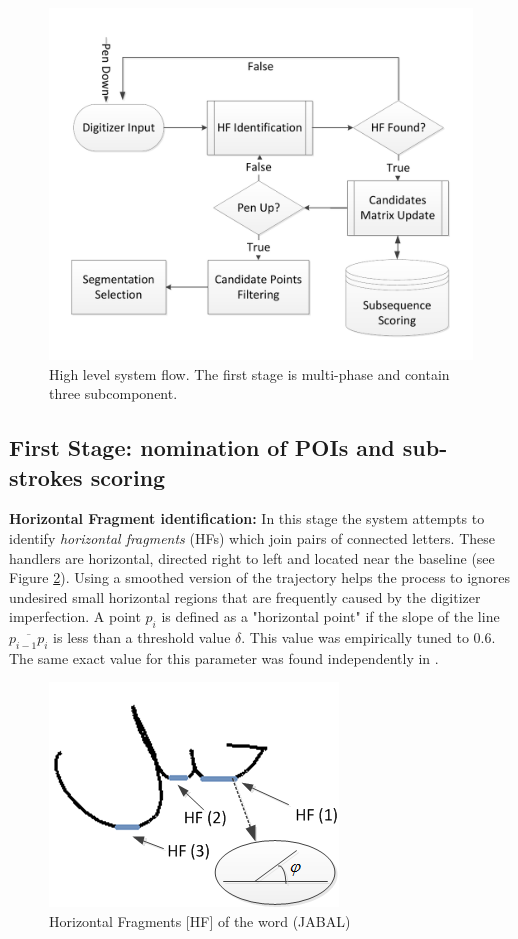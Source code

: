 \documentclass[journal,compsoc]{IEEEtran}
\begin{document}
\begin{figure}
\centering
\includegraphics[width=1.05\columnwidth]{./figures/system_flow}
\caption{High level system flow. The first stage is multi-phase and contain three subcomponent. }
\label{fig:system_flow}
\end{figure}

\subsection{First Stage: nomination of POIs and sub-strokes scoring}

\textbf{Horizontal Fragment identification:} In this stage the system attempts to identify \emph{horizontal fragments} (HFs) which join pairs of connected letters. These handlers are horizontal, directed right to left and located near the baseline (see Figure  \ref{fig:horizontal_fragments}). Using a smoothed version of the trajectory helps the process to ignores undesired small horizontal regions that are frequently caused by the digitizer imperfection.  A point $p_{i}$ is defined as a "horizontal point" if the slope of the line $\overline{p_{i-1}p_{i}}$ is less than a threshold value $\delta$. This value was empirically tuned to $0.6$. The same exact value for this parameter was found independently in \cite{daifallah2009recognition}.\\

\begin{figure}
\centering
\includegraphics[width=0.5\columnwidth]{./figures/horizontal_fragments}
\caption{Horizontal Fragments [HF] of the word (JABAL)}
\label{fig:horizontal_fragments}
\end{figure}
\end{document}
